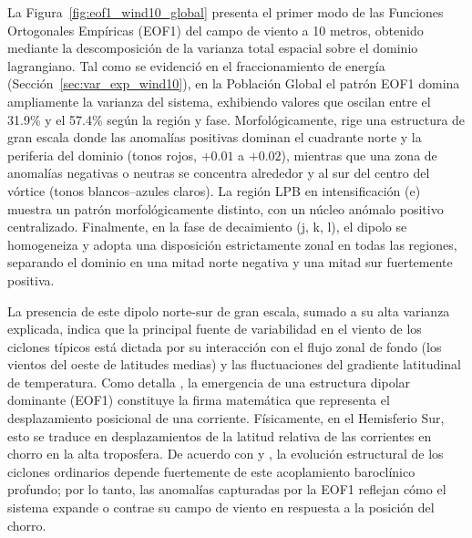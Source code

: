 La Figura~\ref{fig:eof1_wind10_global} presenta el primer modo de las Funciones Ortogonales Empíricas (EOF1) del campo de viento a 10 metros, obtenido mediante la descomposición de la varianza total espacial sobre el dominio lagrangiano. 
Tal como se evidenció en el fraccionamiento de energía (Sección~\ref{sec:var_exp_wind10}), en la Población Global el patrón EOF1 domina ampliamente la varianza del sistema, exhibiendo valores que oscilan entre el 31.9\% y el 57.4\% según la región y fase. 
Morfológicamente, rige una estructura de gran escala donde las anomalías positivas dominan el cuadrante norte y la periferia del dominio (tonos rojos, $+0.01$ a $+0.02$), mientras que una zona de anomalías negativas o neutras se concentra alrededor y al sur del centro del vórtice (tonos blancos--azules claros). 
La región LPB en intensificación (e) muestra un patrón morfológicamente distinto, con un núcleo anómalo positivo centralizado. Finalmente, en la fase de decaimiento (j, k, l), el dipolo se homogeneiza y adopta una disposición estrictamente zonal en todas las regiones, separando el dominio en una mitad norte negativa y una mitad sur fuertemente positiva.

La presencia de este dipolo norte-sur de gran escala, sumado a su alta varianza explicada, indica que la principal fuente de variabilidad en el viento de los ciclones típicos está dictada por su interacción con el flujo zonal de fondo (los vientos del oeste de latitudes medias) y las fluctuaciones del gradiente latitudinal de temperatura. 
Como detalla \citet{hannachi2007empirical}, la emergencia de una estructura dipolar dominante (EOF1) constituye la firma matemática que representa el desplazamiento posicional de una corriente. 
Físicamente, en el Hemisferio Sur, esto se traduce en desplazamientos de la latitud relativa de las corrientes en chorro en la alta troposfera.
De acuerdo con \citet{hoskins2005new} y \citet{dossantos2023response}, la evolución estructural de los ciclones ordinarios depende fuertemente de este acoplamiento baroclínico profundo; por lo tanto, las anomalías capturadas por la EOF1 reflejan cómo el sistema expande o contrae su campo de viento en respuesta a la posición del chorro. 

